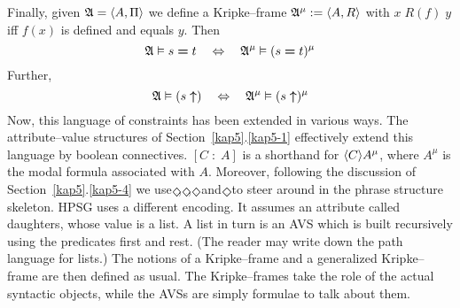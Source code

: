 Finally, given $\mathfrak{A} = \langle A, \Pi\rangle$ we define a Kripke--frame
$\mathfrak{A}^{\mu} := \langle A, R\rangle$ with $x\; R(f)\; y$ iff
$f(x)$ is defined and equals $y$. Then
\begin{equation}
\mathfrak{A} \vDash s \boldsymbol{=} t
\quad\Leftrightarrow\quad
\mathfrak{A}^{\mu} \vDash (s \boldsymbol{=} t)^{\mu}
\end{equation}
Further,
\begin{equation}
\mathfrak{A} \vDash (s \boldsymbol{\uparrow})
\quad\Leftrightarrow\quad
\mathfrak{A}^{\mu} \vDash (s \boldsymbol{\uparrow})^{\mu}
\end{equation}
Now, this language of constraints has been extended in various
ways. The attribute--value structures of Section~\ref{kap5}.\ref{kap5-1}
effectively extend this language by boolean connectives. $[C \; :
\; A]$ is a shorthand for $\langle C\rangle A^{\mu}$, where $A^{\mu}$ is
the modal formula associated with $A$. Moreover, following the
discussion of Section~\ref{kap5}.\ref{kap5-4} we use $\links$, $\rechts$,
$\oben$ and $\unten$ to steer around in the phrase structure
skeleton. HPSG uses a different encoding. It assumes an attribute
called {\sc daughters}, whose value is a list. A list in turn is
an AVS which is built recursively using the predicates {\sc first}
and {\sc rest}. (The reader may write down the path language for
lists.) The notions of a Kripke--frame and a generalized
Kripke--frame are then defined as usual. The
Kripke--frames take the role of the actual syntactic objects,
while the AVSs are simply formulae to talk about them.

